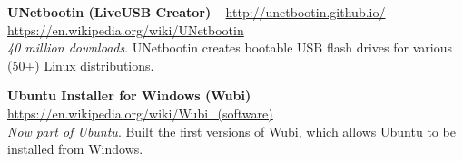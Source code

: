 \documentclass[margin,line]{resume}
\begin{document}
\begin{resume}
\textbf{UNetbootin (LiveUSB Creator)} -- \url{http://unetbootin.github.io/} \hfill \url{https://en.wikipedia.org/wiki/UNetbootin}\\ %
\emph{40 million downloads}. UNetbootin creates bootable USB flash drives for various (50+) Linux distributions.\\ %

\vspace{-6.5mm}

\textbf{Ubuntu Installer for Windows (Wubi)} \hfill \url{https://en.wikipedia.org/wiki/Wubi_(software)}\\ %
\emph{Now part of Ubuntu}. Built the first versions of Wubi, which allows Ubuntu to be installed from Windows. %







\end{resume}
\end{document}
